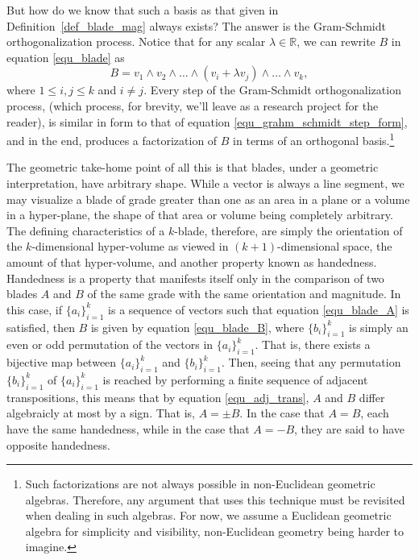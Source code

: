 \documentclass[12pt]{article}
\numberwithin{equation}{section}
\newcommand{\R}{\mathbb{R}}
\begin{document}
But how do we know that such a basis as that given in Definition~\ref{def_blade_mag} always exists?
The answer is the Gram-Schmidt orthogonalization process.
Notice that for any scalar $\lambda\in\R$,
we can rewrite $B$ in equation \eqref{equ_blade} as
\begin{equation}\label{equ_grahm_schmidt_step_form}
B = v_1\wedge v_2\wedge\dots\wedge(v_i+\lambda v_j)\wedge\dots\wedge v_k,
\end{equation}
where $1\leq i,j\leq k$ and $i\neq j$.  Every step of the Gram-Schmidt
orthogonalization process, (which process, for brevity, we'll leave as a research project for the reader),
is similar in form to that of equation \eqref{equ_grahm_schmidt_step_form}, and in the end, produces
a factorization of $B$ in terms of an orthogonal basis.\footnote{Such factorizations are not
always possible in non-Euclidean geometric algebras.  Therefore, any argument that uses
this technique must be revisited when dealing in such algebras.  For now, we assume a
Euclidean geometric algebra for simplicity and visibility, non-Euclidean geometry being harder to imagine.}

The geometric take-home point of all this is that blades, under a geometric interpretation,
have arbitrary shape.  While a vector is always a line segment, we may visualize a blade of
grade greater than one
as an area in a plane or a volume in a hyper-plane, the shape of that area or volume being completely
arbitrary.  The defining characteristics of a $k$-blade, therefore, are simply the orientation of the $k$-dimensional
hyper-volume as viewed in $(k+1)$-dimensional space,
the amount of that hyper-volume, and another property known as handedness.
Handedness is a property
that manifests itself only in the comparison of two blades $A$ and $B$ of the same grade with
the same orientation
and magnitude.  In this case, if $\{a_i\}_{i=1}^k$ is a sequence of vectors such
that equation \eqref{equ_blade_A} is satisfied, then $B$ is given by equation
\eqref{equ_blade_B}, where $\{b_i\}_{i=1}^k$ is simply an even or odd permutation
of the vectors in $\{a_i\}_{i=1}^k$.  That is, there exists a bijective map between
$\{a_i\}_{i=1}^k$ and $\{b_i\}_{i=1}^k$.
Then, seeing that any permutation $\{b_i\}_{i=1}^k$ of $\{a_i\}_{i=1}^k$
is reached by performing a finite sequence of adjacent transpositions, this means that
by equation \eqref{equ_adj_trans}, $A$ and $B$ differ algebraicly at most by a sign.
That is, $A=\pm B$.  In the case that $A=B$, each have the same handedness,
while in the case that $A=-B$, they are said to have opposite handedness.
\end{document}

